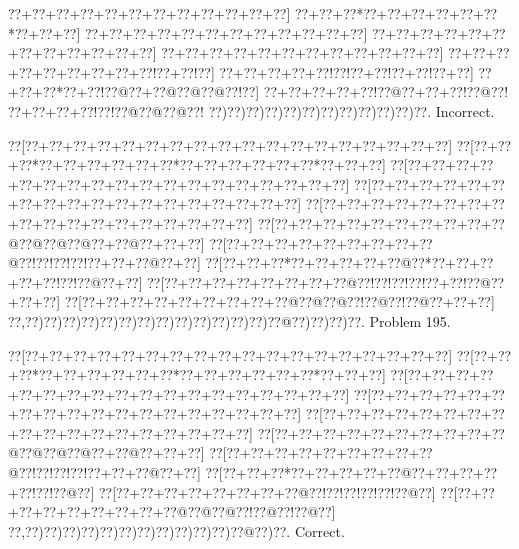 \documentclass[a5paper]{article}
\begin{document}
\begin{center}
{\goo
\0??+\0??+\0??+\0??+\0??+\0??+\0??+\0??+\0??+\0??+\0??+\0??]
\0??+\0??+\0??*\0??+\0??+\0??+\0??+\0??+\0??*\0??+\0??+\0??]
\0??+\0??+\0??+\0??+\0??+\0??+\0??+\0??+\0??+\0??+\0??+\0??]
\0??+\0??+\0??+\0??+\0??+\0??+\0??+\0??+\0??+\0??+\0??+\0??]
\0??+\0??+\0??+\0??+\0??+\0??+\0??+\0??+\0??+\0??+\0??+\0??]
\0??+\0??+\0??+\0??+\0??+\0??+\0??+\0??+\0??!\0??+\0??!\0??]
\0??+\0??+\0??+\0??+\0??!\0??!\0??+\0??!\0??+\0??!\0??+\0??]
\0??+\0??+\0??*\0??+\0??!\0??@\0??+\0??@\0??@\0??@\0??!\0??]
\0??+\0??+\0??+\0??+\0??!\0??@\0??+\0??+\0??!\0??@\0??!
\0??+\0??+\0??+\0??!\0??!\0??@\0??@\0??@\0??!
\0??)\0??)\0??)\0??)\0??)\0??)\0??)\0??)\0??)\0??)\0??)\0??.
}
Incorrect. 

\end{center}
\newpage
\begin{center}
{\goo
\0??[\0??+\0??+\0??+\0??+\0??+\0??+\0??+\0??+\0??+\0??+\0??+\0??+\0??+\0??+\0??+\0??+\0??+\0??]
\0??[\0??+\0??+\0??*\0??+\0??+\0??+\0??+\0??+\0??*\0??+\0??+\0??+\0??+\0??+\0??*\0??+\0??+\0??]
\0??[\0??+\0??+\0??+\0??+\0??+\0??+\0??+\0??+\0??+\0??+\0??+\0??+\0??+\0??+\0??+\0??+\0??+\0??]
\0??[\0??+\0??+\0??+\0??+\0??+\0??+\0??+\0??+\0??+\0??+\0??+\0??+\0??+\0??+\0??+\0??+\0??+\0??]
\0??[\0??+\0??+\0??+\0??+\0??+\0??+\0??+\0??+\0??+\0??+\0??+\0??+\0??+\0??+\0??+\0??+\0??+\0??]
\0??[\0??+\0??+\0??+\0??+\0??+\0??+\0??+\0??+\0??+\0??@\0??@\0??@\0??@\0??+\0??@\0??+\0??+\0??]
\0??[\0??+\0??+\0??+\0??+\0??+\0??+\0??+\0??+\0??@\0??!\0??!\0??!\0??!\0??+\0??+\0??@\0??+\0??]
\0??[\0??+\0??+\0??*\0??+\0??+\0??+\0??+\0??@\0??*\0??+\0??+\0??+\0??+\0??!\0??!\0??@\0??+\0??]
\0??[\0??+\0??+\0??+\0??+\0??+\0??+\0??+\0??@\0??!\0??!\0??!\0??!\0??+\0??!\0??@\0??+\0??+\0??]
\0??[\0??+\0??+\0??+\0??+\0??+\0??+\0??+\0??+\0??@\0??@\0??@\0??!\0??@\0??!\0??@\0??+\0??+\0??]
\0??,\0??)\0??)\0??)\0??)\0??)\0??)\0??)\0??)\0??)\0??)\0??)\0??)\0??)\0??@\0??)\0??)\0??)\0??.
}
Problem 195.

\end{center}
\begin{center}
{\goo
\0??[\0??+\0??+\0??+\0??+\0??+\0??+\0??+\0??+\0??+\0??+\0??+\0??+\0??+\0??+\0??+\0??+\0??+\0??]
\0??[\0??+\0??+\0??*\0??+\0??+\0??+\0??+\0??+\0??*\0??+\0??+\0??+\0??+\0??+\0??*\0??+\0??+\0??]
\0??[\0??+\0??+\0??+\0??+\0??+\0??+\0??+\0??+\0??+\0??+\0??+\0??+\0??+\0??+\0??+\0??+\0??+\0??]
\0??[\0??+\0??+\0??+\0??+\0??+\0??+\0??+\0??+\0??+\0??+\0??+\0??+\0??+\0??+\0??+\0??+\0??+\0??]
\0??[\0??+\0??+\0??+\0??+\0??+\0??+\0??+\0??+\0??+\0??+\0??+\0??+\0??+\0??+\0??+\0??+\0??+\0??]
\0??[\0??+\0??+\0??+\0??+\0??+\0??+\0??+\0??+\0??+\0??@\0??@\0??@\0??@\0??+\0??@\0??+\0??+\0??]
\0??[\0??+\0??+\0??+\0??+\0??+\0??+\0??+\0??+\0??@\0??!\0??!\0??!\0??!\0??+\0??+\0??@\0??+\0??]
\0??[\0??+\0??+\0??*\0??+\0??+\0??+\0??+\0??@\0??+\0??+\0??+\0??+\0??!\0??!\0??@\0??]
\0??[\0??+\0??+\0??+\0??+\0??+\0??+\0??+\0??@\0??!\0??!\0??!\0??!\0??!\0??@\0??]
\0??[\0??+\0??+\0??+\0??+\0??+\0??+\0??+\0??+\0??@\0??@\0??@\0??!\0??@\0??!\0??@\0??]
\0??,\0??)\0??)\0??)\0??)\0??)\0??)\0??)\0??)\0??)\0??)\0??)\0??@\0??)\0??.
}
Correct. 

\end{center}
\end{document}
